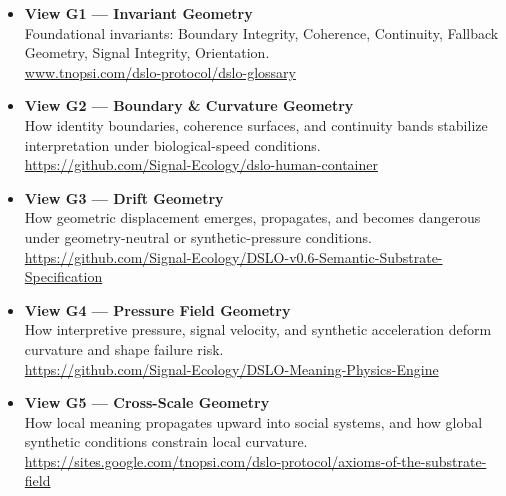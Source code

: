\documentclass[11pt]{article}
\begin{document}
\medskip

\begin{itemize}[leftmargin=1.2cm]

    \item \textbf{View G1 — Invariant Geometry} \\
    Foundational invariants: Boundary Integrity, Coherence, Continuity,
    Fallback Geometry, Signal Integrity, Orientation. \\
    \href{https://github.com/Signal-Ecology/dslo-human-container}
         {www.tnopsi.com/dslo-protocol/dslo-glossary}

    \item \textbf{View G2 — Boundary \& Curvature Geometry} \\
    How identity boundaries, coherence surfaces, and continuity bands stabilize
    interpretation under biological-speed conditions. \\
    \href{https://sites.google.com/tnopsi.com/dslo-protocol/dslo-principles}
         {https://github.com/Signal-Ecology/dslo-human-container}

    \item \textbf{View G3 — Drift Geometry} \\
    How geometric displacement emerges, propagates, and becomes dangerous under
    geometry-neutral or synthetic-pressure conditions. \\
    \href{https://github.com/Signal-Ecology/DSLO-v0.6-Semantic-Substrate-Specification}
         {https://github.com/Signal-Ecology/DSLO-v0.6-Semantic-Substrate-Specification}

    \item \textbf{View G4 — Pressure Field Geometry} \\
    How interpretive pressure, signal velocity, and synthetic acceleration deform
    curvature and shape failure risk. \\
    \href{https://github.com/Signal-Ecology/DSLO-Meaning-Physics-Engine}
         {https://github.com/Signal-Ecology/DSLO-Meaning-Physics-Engine}

    \item \textbf{View G5 — Cross-Scale Geometry} \\
    How local meaning propagates upward into social systems, and how global
    synthetic conditions constrain local curvature. \\
    \href{https://sites.google.com/tnopsi.com/dslo-protocol/axioms-of-the-substrate-field}
         {https://sites.google.com/tnopsi.com/dslo-protocol/axioms-of-the-substrate-field}


\end{itemize}
\end{document}
